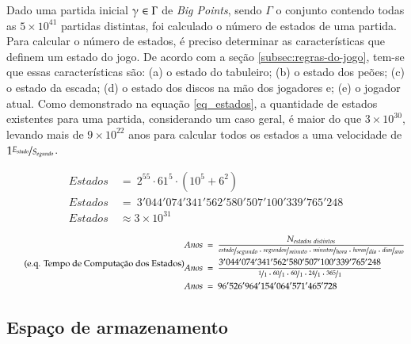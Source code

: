 Dado uma partida inicial $\gammaup \in \Gamma$ de \emph{Big Points}, sendo $\Gamma$ o conjunto contendo todas as $5\times 10^{41}$ partidas distintas, foi calculado o número de estados de uma partida. Para calcular o número de estados, é preciso determinar as características que definem um estado do jogo. De acordo com a seção \ref{subsec:regras-do-jogo}, tem-se que essas características são: (a) o estado do tabuleiro; (b) o estado dos peões; (c) o estado da escada; (d) o estado dos discos na mão dos jogadores e; (e) o jogador atual. Como demonstrado na equação \ref{eq_estados}, a quantidade de estados existentes para uma partida, considerando um caso geral, é maior do que $3\times 10^{30}$, levando mais de $9\times 10^{22}$ anos para calcular todos os estados a uma velocidade de $1 \nicefrac{E_{stado}}{S_{egundo}}$.

\begin{equation} \label{eq_estados} \tag{e.q. Caso Geral}
\begin{split}
Estados\ &=\ 2^{55}\cdot 61^{5}\cdot (10^{5} + 6^{2})\\
Estados\ &=\ 3'044'074'341'562'580'507'100'339'765'248\\
Estados\ &\approx 3\times 10^{31}
\end{split}
\end{equation}

\begin{equation} \label{eq_anos_estados} \tag{e.q. Tempo de Computação dos Estados}
\begin{split}
Anos\ &=\ \dfrac{N_{estados\ distintos}}{\nicefrac{estado}{segundo}\cdot\nicefrac{segundos}{minuto}\cdot\nicefrac{minutos}{hora}\cdot\nicefrac{horas}{dia}\cdot\nicefrac{dias}{ano}}\\
Anos\ &=\ \dfrac{3'044'074'341'562'580'507'100'339'765'248}{\nicefrac{1}{1}\cdot\nicefrac{60}{1}\cdot\nicefrac{60}{1}\cdot\nicefrac{24}{1}\cdot\nicefrac{365}{1}}\\
Anos\ &=\ 96'526'964'154'064'571'465'728
\end{split}
\end{equation}

\subsection{Espaço de armazenamento}

